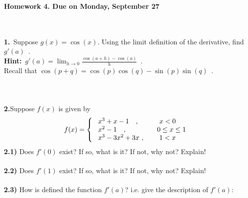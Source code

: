 \documentclass[12pt]{article}
\newcommand{\ds}{\displaystyle}
\newcommand{\Frac}{\displaystyle \frac}
\begin{document}
\newpage
\begin{center}
\textbf{Homework 4. Due on Monday, September 27}
\end{center}\
\\
\\
\textbf{1.}\ Suppose $g(x)=\cos(x)$. Using the limit definition of
the derivative, find $g'(a)$\ .\\
\textbf{Hint:}\ $g'(a)=\ds\lim_{h\to
0}\Frac{\cos(a+h)-\cos(a)}{h}$\ .\\
Recall that $\cos(p+q)=\cos(p)\cos(q)-\sin(p)\sin(q)$\ .\\
\\
\\
\\
\textbf{2.}Suppose $f(x)$ is given by
$$f(x)=\left\{ \begin{array}{ll}
              \ x^{3}+x-1\   \    \ ,& \   \   \  \  \hbox{$ x< 0$}
              \\
              \ x^{2}-1  \   \   \ , & \   \   \   \hbox{$0\leq x\leq1$}
              \\
\ x^{3}-3x^{2}+3x  \ , & \   \   \   \  \hbox{$1<x$}
                \end{array}
            \right. $$
\textbf{2.1)} Does $f'(0)$ exist? If so, what is it? If not, why not? Explain!\\
\\
\textbf{2.2)} Does $f'(1)$ exist? If so, what is it? If not, why not? Explain!\\
\\
\textbf{2.3)} How is defined the function $f'(a)$? i.e. give the
description of $f'(a)$:
\end{document}
